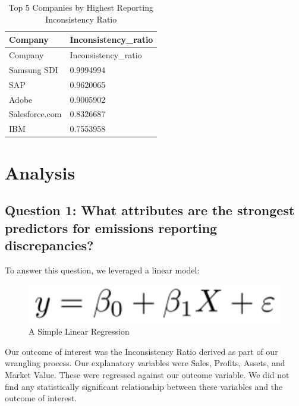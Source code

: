 \documentclass[
  12pt,
]{article}
\begin{document}
\begin{longtable}[]{@{}ll@{}}
\caption{Top 5 Companies by Highest Reporting Inconsistency
Ratio}\tabularnewline
\toprule
Company & Inconsistency\_ratio \\
\midrule
\endfirsthead
\toprule
Company & Inconsistency\_ratio \\
\midrule
\endhead
Samsung SDI & 0.9994994 \\
SAP & 0.9620065 \\
Adobe & 0.9005902 \\
Salesforce.com & 0.8326687 \\
IBM & 0.7553958 \\
\bottomrule
\end{longtable}

\newpage

\hypertarget{analysis}{%
\section{Analysis}\label{analysis}}

\hypertarget{question-1-what-attributes-are-the-strongest-predictors-for-emissions-reporting-discrepancies}{%
\subsection{Question 1: What attributes are the strongest predictors for
emissions reporting
discrepancies?}\label{question-1-what-attributes-are-the-strongest-predictors-for-emissions-reporting-discrepancies}}

To answer this question, we leveraged a linear model:

\begin{figure}
\centering
\includegraphics{./BoothProphete_Report_files/figure-latex/Linear_regression.png}
\caption{A Simple Linear Regression}
\end{figure}

Our outcome of interest was the Inconsistency Ratio derived as part of
our wrangling process. Our explanatory variables were Sales, Profits,
Assets, and Market Value. These were regressed against our outcome
variable. We did not find any statistically significant relationship
between these variables and the outcome of interest.
\end{document}
